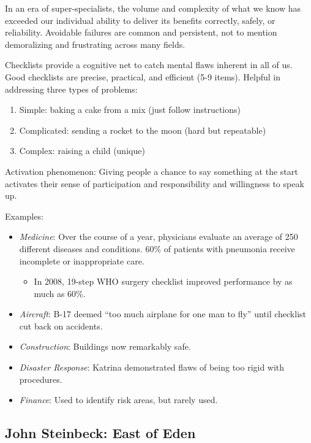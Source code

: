 \documentclass[
]{article}
\providecommand{\tightlist}{%
  \setlength{\itemsep}{0pt}\setlength{\parskip}{0pt}}
\begin{document}
In an era of super-specialists, the volume and complexity of what we
know has exceeded our individual ability to deliver its benefits
correctly, safely, or reliability. Avoidable failures are common and
persistent, not to mention demoralizing and frustrating across many
fields.

Checklists provide a cognitive net to catch mental flaws inherent in all
of us. Good checklists are precise, practical, and efficient (5-9
items). Helpful in addressing three types of problems:

\begin{enumerate}
\def\labelenumi{\arabic{enumi}.}
\item
  Simple: baking a cake from a mix (just follow instructions)
\item
  Complicated: sending a rocket to the moon (hard but repeatable)
\item
  Complex: raising a child (unique)
\end{enumerate}

Activation phenomenon: Giving people a chance to say something at the
start activates their sense of participation and responsibility and
willingness to speak up.

Examples:

\begin{itemize}
\item
  \emph{Medicine}: Over the course of a year, physicians evaluate an
  average of 250 different diseases and conditions. 60\% of patients
  with pneumonia receive incomplete or inappropriate care.

  \begin{itemize}
  \tightlist
  \item
    In 2008, 19-step WHO surgery checklist improved performance by as
    much as 60\%.
  \end{itemize}
\item
  \emph{Aircraft}: B-17 deemed ``too much airplane for one man to fly''
  until checklist cut back on accidents.
\item
  \emph{Construction}: Buildings now remarkably safe.
\item
  \emph{Disaster Response}: Katrina demonstrated flaws of being too
  rigid with procedures.
\item
  \emph{Finance}: Used to identify risk areas, but rarely used.
\end{itemize}

\hypertarget{john-steinbeck-east-of-eden}{%
\subsection{John Steinbeck: East of
Eden}\label{john-steinbeck-east-of-eden}}
\end{document}
